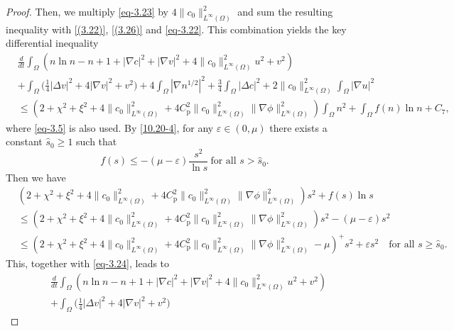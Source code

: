 \documentclass[reqno]{amsart}
\begin{document}
\begin{proof}
Then, we multiply \eqref{eq-3.23} by $4\|c_0\|^2_{L^\infty(\Omega)}$ and sum 
the resulting inequality with \eqref{(3.22)}, \eqref{(3.26)} and \eqref{eq-3.22}. 
This combination yields the key differential inequality
\begin{equation}\label{eq-3.24}
\begin{aligned}
&\frac{d}{dt} \int_{\Omega} \left( n \ln n - n + 1 + |\nabla c|^2 
+ |\nabla v|^2 + 4\|c_0\|_{L^\infty(\Omega)}^2 u^2 +  v^2\right) \\
& +\int_{\Omega}\Big(\frac{1}{4} |\Delta v|^2+4|\nabla v|^2+ v^2\Big) 
+ 4 \int_{\Omega}| \nabla n^{1/2}|^2
+ \frac{3}{4} \int_{\Omega} |\Delta c|^2  
+2 \|c_0\|_{L^\infty(\Omega)}^2 \int_{\Omega} |\nabla u|^2 \\
&\leq \left( 2 + \chi^2 + \xi^2+4\|c_0\|_{L^\infty(\Omega)}^2 
 + 4 C_{\mathrm{p}}^2\|c_0\|_{L^\infty(\Omega)}^2 
 \|\nabla \phi\|_{L^\infty(\Omega)}^2\right) 
 \int_{\Omega} n^2 + \int_{\Omega}  f(n)\ln n + C_7,
\end{aligned}
\end{equation}
where \eqref{eq-3.5} is also used.
By  \eqref{10.20-4}, for any $\varepsilon \in (0, \mu)$ there exists a constant 
$\hat{s}_0\geq 1$ such that
\begin{equation} \label{eq-3.25}
    f(s) \leq -(\mu - \varepsilon) \frac{s^2}{\ln s} \ \text{for all } s > \hat{s}_0.
\end{equation}
Then we have
\begin{align*}
&(2 + \chi^2 + \xi^2+  4\|c_0\|_{L^\infty(\Omega)}^2
 +4 C_{\mathrm{p}}^2\|c_0\|_{L^\infty(\Omega)}^2 \|\nabla \phi\|_{L^\infty(\Omega)}^2 ) s^2 +  f(s) \ln s \\
&\leq ( 2 + \chi^2 + \xi^2+ 4\|c_0\|_{L^\infty(\Omega)}^2
 +4 C_{\mathrm{p}}^2\|c_0\|_{L^\infty(\Omega)}^2 \|\nabla \phi\|_{L^\infty(\Omega)}^2) s^2 - (\mu - \varepsilon)s^2\\
&\leq \left( 2 + \chi^2 + \xi^2 + 4\|c_0\|_{L^\infty(\Omega)}^2
 + 4 C_{\mathrm{p}}^2\|c_0\|_{L^\infty(\Omega)}^2 \|\nabla \phi\|_{L^\infty(\Omega)}^2 - \mu\right)^+ s^2 + \varepsilon s^2 \quad
\text{for all } s \geq \hat{s}_0.
\end{align*}
This, together with \eqref{eq-3.24}, leads to
\begin{equation}\label{eq-3.26}
\begin{aligned}
&\frac{d}{dt} \int_{\Omega} \left( n \ln n - n + 1 + |\nabla c|^2 + |\nabla v|^2 + 4\|c_0\|_{L^\infty(\Omega)}^2 u^2 + v^2 \right)\\
& +\int_{\Omega}\Big(\frac{1}{4} |\Delta v|^2+4|\nabla v|^2+ v^2\Big)

\end{aligned}
\end{equation}
\end{proof}
\end{document}
